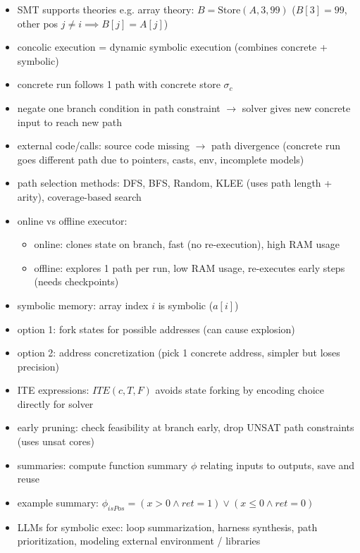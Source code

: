 \documentclass[11pt]{book}
\begin{document}
\begin{itemize}
\item SMT supports theories e.g. array theory: $B = \text{Store}(A, 3, 99)$ ($B[3]=99$, other pos $j \neq i \implies B[j] = A[j]$)

\item concolic execution = dynamic symbolic execution (combines concrete + symbolic)
\item concrete run follows 1 path with concrete store $\sigma_c$
\item negate one branch condition in path constraint $\rightarrow$ solver gives new concrete input to reach new path

\item external code/calls: source code missing $\rightarrow$ path divergence (concrete run goes different path due to pointers, casts, env, incomplete models)

\item path selection methods: DFS, BFS, Random, KLEE (uses path length + arity), coverage-based search

\item online vs offline executor:
\begin{itemize}
    \item online: clones state on branch, fast (no re-execution), high RAM usage
    \item offline: explores 1 path per run, low RAM usage, re-executes early steps (needs checkpoints)
\end{itemize}

\item symbolic memory: array index $i$ is symbolic ($a[i]$)
\item option 1: fork states for possible addresses (can cause explosion)
\item option 2: address concretization (pick 1 concrete address, simpler but loses precision)

\item ITE expressions: $ITE(c, T, F)$ avoids state forking by encoding choice directly for solver

\item early pruning: check feasibility at branch early, drop UNSAT path constraints (uses unsat cores)

\item summaries: compute function summary $\phi$ relating inputs to outputs, save and reuse
\item example summary: $\phi_{isPos} = (x > 0 \land ret = 1) \lor (x \leq 0 \land ret = 0)$

\item LLMs for symbolic exec: loop summarization, harness synthesis, path prioritization, modeling external environment / libraries
\end{itemize}
\end{document}
